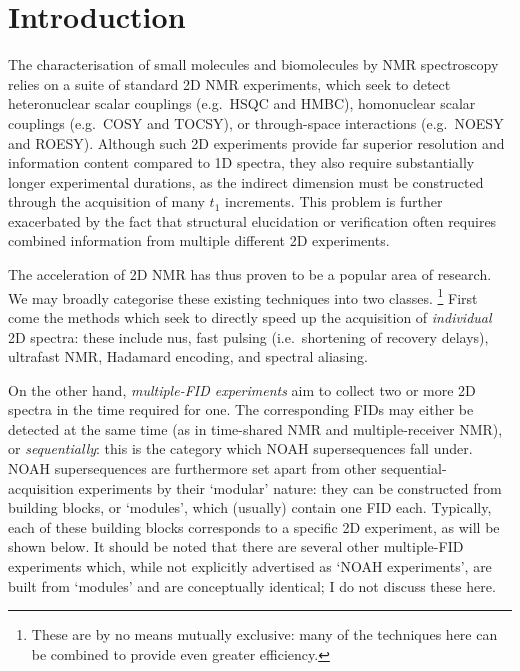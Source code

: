 \section{Introduction}
\label{sec:noah__introduction}

The characterisation of small molecules and biomolecules by NMR spectroscopy relies on a suite of standard 2D NMR experiments, which seek to detect heteronuclear scalar couplings (e.g.\ HSQC and HMBC), homonuclear scalar couplings (e.g.\ COSY and TOCSY), or through-space interactions (e.g.\ NOESY and ROESY).
Although such 2D experiments provide far superior resolution and information content compared to 1D spectra, they also require substantially longer experimental durations, as the indirect dimension must be constructed through the acquisition of many $t_1$ increments.
This problem is further exacerbated by the fact that structural elucidation or verification often requires combined information from multiple different 2D experiments.

The acceleration of 2D NMR has thus proven to be a popular area of research.
We may broadly categorise these existing techniques into two classes.%
\footnote{These are by no means mutually exclusive: many of the techniques here can be combined to provide even greater efficiency.}
First come the methods which seek to directly speed up the acquisition of \textit{individual} 2D spectra: these include
\acf{nus}\autocite{Barna1987JMR,Kazimierczuk2010PNMRS,Mobli2014PNMRS,Kazimierczuk2015MRC},
fast pulsing (i.e.\ shortening of recovery delays)\autocite{SchulzeSunninghausen2014JACS,Schanda2006JACS,Kupce2007MRC,Schanda2009PNMRS},
ultrafast NMR\autocite{Frydman2002PNASUSA,Pelupessy2003JACS,Frydman2003JACS,Tal2010PNMRS,Gouilleux2018ARNMRS,Kupce2021NRMP},
Hadamard encoding\autocite{Kupce2003JMR,Kupce2003PNMRS},
and spectral aliasing\autocite{Jeannerat2000MRC,Bermel2009JACS,Njock2010C,Jeannerat2011eMR}.

On the other hand, \textit{multiple-FID experiments} aim to collect two or more 2D spectra in the time required for one.
The corresponding FIDs may either be detected at the same time (as in
time-shared NMR\autocite{Nolis2007ACIE,Parella2010CMR,Nolis2019JMR_psHSQC} and
multiple-receiver NMR\autocite{Kupce2006JACS,Kupce2008JACS,Kovacs2016MRC}),
or \textit{sequentially}: this is the category which NOAH supersequences\autocite{Kupce2017ACIE,Kupce2021PNMRS,Kupce2021NRMP} fall under.
NOAH supersequences are furthermore set apart from other sequential-acquisition experiments\autocite{Haasnoot1984JMR,Gurevich1984JMR,MotiramCorral2018CC,Nolis2019MRC,Nolis2019CPC,Nolis2019JMR} by their `modular' nature: they can be constructed from building blocks, or `modules', which (usually) contain one FID each.
Typically, each of these building blocks corresponds to a specific 2D experiment, as will be shown below.
It should be noted that there are several other multiple-FID experiments which, while not explicitly advertised as `NOAH experiments', are built from `modules' and are conceptually identical\autocite{Nagy2019CC,Nagy2020JMR,Nagy2021ACIE,Timari2022CC}; I do not discuss these here.

